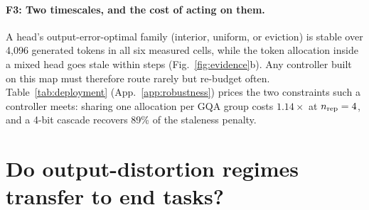 \documentclass{article}
\theoremstyle{definition}
\begin{document}
\paragraph{F3: Two timescales, and the cost of acting on them.}
A head's output-error-optimal family (interior, uniform, or eviction) is stable over 4,096 generated tokens in all six measured cells, while the token allocation inside a mixed head goes stale within steps (Fig.~\ref{fig:evidence}b).  Any controller built on this map must therefore route rarely but re-budget often.  Table~\ref{tab:deployment} (App.~\ref{app:robustness}) prices the two constraints such a controller meets: sharing one allocation per GQA group costs $1.14\times$ at $n_{\rm rep}=4$, and a 4-bit cascade recovers 89\% of the staleness penalty.



\section{Do output-distortion regimes transfer to end tasks?}
\label{sec:endtask}
\end{document}
